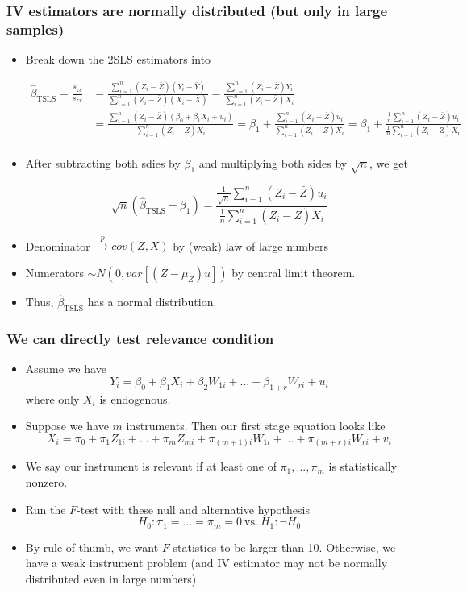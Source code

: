 \documentclass[aspectratio=169]{beamer}
\begin{document}
\begin{frame}
\frametitle{IV estimators are normally distributed (but only in large samples)}
\begin{itemize}
\item Break down the 2SLS estimators into
\begin{scriptsize}
\[
\begin{aligned}
\hat{\beta}_{\text{TSLS}}=\frac{s_{zy}}{s_{zx}}&=\frac{\sum_{i=1}^n(Z_i-\bar{Z})(Y_i-\bar{Y})}{\sum_{i=1}^n(Z_i-\bar{Z})(X_i-\bar{X})}= \frac{\sum_{i=1}^n(Z_i-\bar{Z})Y_i}{\sum_{i=1}^n(Z_i-\bar{Z})X_i}\\
\
&= \frac{\sum_{i=1}^n(Z_i-\bar{Z})(\beta_0+\beta_1X_i + u_i) }{\sum_{i=1}^n(Z_i-\bar{Z})X_i}= \beta_1+\frac{\sum_{i=1}^n(Z_i-\bar{Z})u_i}{\sum_{i=1}^n(Z_i-\bar{Z})X_i}=\beta_1+\frac{\frac{1}{n}\sum_{i=1}^n(Z_i-\bar{Z})u_i}{\frac{1}{n}\sum_{i=1}^n(Z_i-\bar{Z})X_i}\\
\end{aligned}
\]
\end{scriptsize}
\item After subtracting both sdies by $\beta_1$ and multiplying both sides by $\sqrt{n}$, we get
\begin{scriptsize}
\[
\sqrt{n}(\hat{\beta}_{\text{TSLS}}-\beta_1)=\frac{\frac{1}{\sqrt{n}}\sum_{i=1}^n(Z_i-\bar{Z})u_i}{\frac{1}{n}\sum_{i=1}^n(Z_i-\bar{Z})X_i}
\]
\end{scriptsize}
\item Denominator $\xrightarrow{p} cov(Z,X)$ by (weak) law of large numbers
\item Numerators $\sim N(0, var[(Z-\mu_Z)u])$ by central limit theorem. 
\item Thus, $\hat{\beta}_{\text{TSLS}}$ has a normal distribution.
\end{itemize}
\end{frame}

\begin{frame}
\frametitle{We can directly test relevance condition}
\begin{itemize}
\item Assume we have
\[
Y_i = \beta_0 + \beta_1X_i + \beta_2 W_{1i}+...+\beta_{1+r}W_{ri}+u_i
\]
where only $X_i$ is endogenous. 
\item Suppose we have $m$ instruments. Then our first stage equation looks like
\[
X_i = \pi_0 + \pi_1Z_{1i}+...+\pi_mZ_{mi} + \pi_{(m+1)i} W_{1i}+...+ \pi_{(m+r)i}W_{ri}+v_i
\]
\item We say our instrument is relevant if at least one of $\pi_1,...,\pi_m$ is statistically nonzero. 
\item Run the $F$-test with these null and alternative hypothesis
\[
H_0: \pi_1 = ... = \pi_m=0 \ \text{vs.} \ H_1: \lnot H_0
\]
\item By rule of thumb, we want $F$-statistics to be larger than 10. Otherwise, we have a weak instrument problem (and IV estimator may not be normally distributed even in large numbers)
\end{itemize}
\end{frame}
\end{document}

